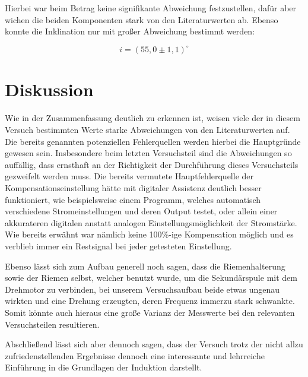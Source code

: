 \documentclass{article}
\newcommand\invisiblesection[1]{%
  \refstepcounter{section}%
  \addcontentsline{toc}{section}{\protect\numberline{\thesection}#1}%
  \sectionmark{#1}\phantom{}}
\begin{document}
Hierbei war beim Betrag keine signifikante Abweichung festzustellen, dafür aber wichen die beiden Komponenten stark von den Literaturwerten ab. Ebenso konnte die Inklination nur mit großer Abweichung bestimmt werden:

\begin{equation}
    i = (55,0 \pm 1,1)^\circ
\end{equation}


\newpage
\section{Diskussion}

Wie in der Zusammenfassung deutlich zu erkennen ist, weisen viele der in diesem Versuch bestimmten Werte starke Abweichungen von den Literaturwerten auf. Die bereits genannten potenziellen Fehlerquellen werden hierbei die Hauptgründe gewesen sein. Insbesondere beim letzten Versuchsteil sind die Abweichungen so auffällig, dass ernsthaft an der Richtigkeit der Durchführung dieses Versuchsteils gezweifelt werden muss. Die bereits vermutete Hauptfehlerquelle der Kompensationseinstellung hätte mit digitaler Assistenz deutlich besser funktioniert, wie beispielsweise einem Programm, welches automatisch verschiedene Stromeinstellungen und deren Output testet, oder allein einer akkurateren digitalen anstatt analogen Einstellungsmöglichkeit der Stromstärke. Wie bereits erwähnt war nämlich keine 100\%-ige Kompensation möglich und es verblieb immer ein Restsignal bei jeder getesteten Einstellung. 

Ebenso lässt sich zum Aufbau generell noch sagen, dass die Riemenhalterung sowie der Riemen selbst, welcher benutzt wurde, um die Sekundärspule mit dem Drehmotor zu verbinden, bei unserem Versuchsaufbau beide etwas ungenau wirkten und eine Drehung erzeugten, deren Frequenz immerzu stark schwankte. Somit könnte auch hieraus eine große Varianz der Messwerte bei den relevanten Versuchsteilen resultieren. 

Abschließend lässt sich aber dennoch sagen, dass der Versuch trotz der nicht allzu zufriedenstellenden Ergebnisse dennoch eine interessante und lehrreiche Einführung in die Grundlagen der Induktion darstellt. 
 
\newpage


\end{document}
